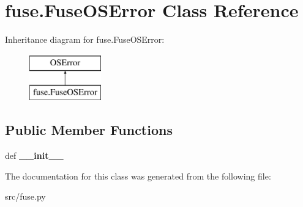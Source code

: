 \hypertarget{classfuse_1_1FuseOSError}{\section{fuse.\-Fuse\-O\-S\-Error Class Reference}
\label{classfuse_1_1FuseOSError}
}
Inheritance diagram for fuse.\-Fuse\-O\-S\-Error\-:\begin{figure}[H]
\begin{center}
\leavevmode
\includegraphics[height=2.000000cm]{classfuse_1_1FuseOSError}
\end{center}
\end{figure}
\subsection*{Public Member Functions}
\begin{DoxyCompactItemize}
\item 
\hypertarget{classfuse_1_1FuseOSError_a1a50e69b2285e04a8103d5c9b8b91343}{def {\bfseries \-\_\-\-\_\-init\-\_\-\-\_\-}}\label{classfuse_1_1FuseOSError_a1a50e69b2285e04a8103d5c9b8b91343}

\end{DoxyCompactItemize}


The documentation for this class was generated from the following file\-:\begin{DoxyCompactItemize}
\item 
src/fuse.\-py\end{DoxyCompactItemize}
